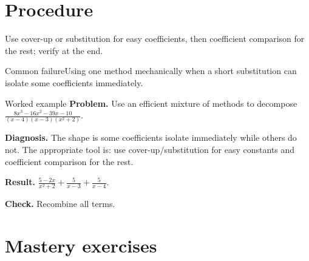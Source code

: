 \documentclass[11pt,oneside]{book}
\begin{document}
\section{Procedure}
Use cover-up or substitution for easy coefficients, then coefficient comparison for the rest; verify at the end.

\begin{warningbox}{Common failure}Using one method mechanically when a short substitution can isolate some coefficients immediately.\end{warningbox}
\begin{examplebox}{Worked example}
\textbf{Problem.} Use an efficient mixture of methods to decompose $\displaystyle \frac{8 x^{3} - 16 x^{2} - 39 x - 10}{\left(x - 4\right) \left(x - 3\right) \left(x^{2} + 2\right)}$.

\textbf{Diagnosis.} The shape is some coefficients isolate immediately while others do not. The appropriate tool is: use cover-up/substitution for easy constants and coefficient comparison for the rest.

\textbf{Result.} $\displaystyle \frac{5 - 2 x}{x^{2} + 2} + \frac{5}{x - 3} + \frac{5}{x - 4}$.

\textbf{Check.} Recombine all terms.
\end{examplebox}
\section{Mastery exercises}
\end{document}
